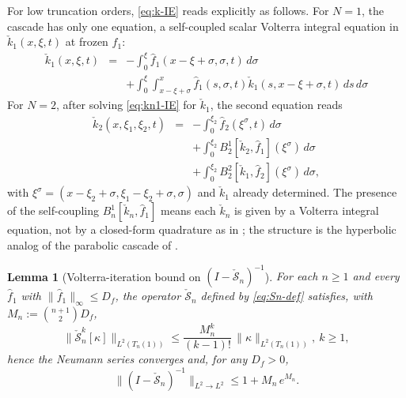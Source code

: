 \documentclass[journal,twoside,web]{ieeecolor}
\newtheorem{lemma}{Lemma}
\begin{document}
For low truncation orders, \eqref{eq:k-IE} reads explicitly as follows. For $N=1$, the cascade has only one equation, a self-coupled scalar Volterra integral equation in $\check k_1(x,\xi,t)$ at frozen $\hat f_1$:
\begin{eqnarray}
\check k_1(x,\xi,t) &=& -\int_0^\xi\hat f_1(x-\xi+\sigma,\sigma,t)\,d\sigma \nonumber\\
&& +\int_0^\xi\!\int_{x-\xi+\sigma}^{x}\!\hat f_1(s,\sigma,t)\check k_1(s,x-\xi+\sigma,t)\,ds\,d\sigma \label{eq:kn1-IE}
\end{eqnarray}
For $N=2$, after solving \eqref{eq:kn1-IE} for $\check k_1$, the second equation reads
\begin{eqnarray}
\check k_2(x,\xi_1,\xi_2,t) &=& -\int_0^{\xi_2}\hat f_2(\xi^\sigma,t)\,d\sigma \nonumber\\
&& +\int_0^{\xi_2}B^1_2[\check k_2,\hat f_1](\xi^\sigma)\,d\sigma \nonumber\\
&& +\int_0^{\xi_2}B^2_2[\check k_1,\hat f_2](\xi^\sigma)\,d\sigma, \label{eq:kn2-IE}
\end{eqnarray}
with $\xi^\sigma=(x-\xi_2+\sigma,\xi_1-\xi_2+\sigma,\sigma)$ and $\check k_1$ already determined. The presence of the self-coupling $B^1_n[\check k_n,\hat f_1]$ means each $\check k_n$ is given by a Volterra integral equation, not by a closed-form quadrature as in \cite{HV1}; the structure is the hyperbolic analog of the parabolic cascade of \cite[eqs.~(60)--(63), Remark~6]{VK102}.


\begin{lemma}[Volterra-iteration bound on $(I-\check{\mathcal S}_n)^{-1}$]\label{lem:Sn-inverse}
For each $n\ge 1$ and every $\hat f_1$ with $\|\hat f_1\|_\infty\le D_f$, the operator $\check{\mathcal S}_n$ defined by \eqref{eq:Sn-def} satisfies, with $M_n:=\binom{n+1}{2}D_f$,
\begin{equation}\label{eq:Sn-iter}
\|\check{\mathcal S}_n^k[\kappa]\|_{L^2(T_n(1))}\le \frac{M_n^k}{(k-1)!}\,\|\kappa\|_{L^2(T_n(1))},\ k\ge 1,
\end{equation}
hence the Neumann series converges and, for any $D_f>0$,
\begin{equation}\label{eq:Sn-inv-bound}
\|(I-\check{\mathcal S}_n)^{-1}\|_{L^2\to L^2}\le 1+M_n\,e^{M_n}.
\end{equation}
\end{lemma}
\end{document}
